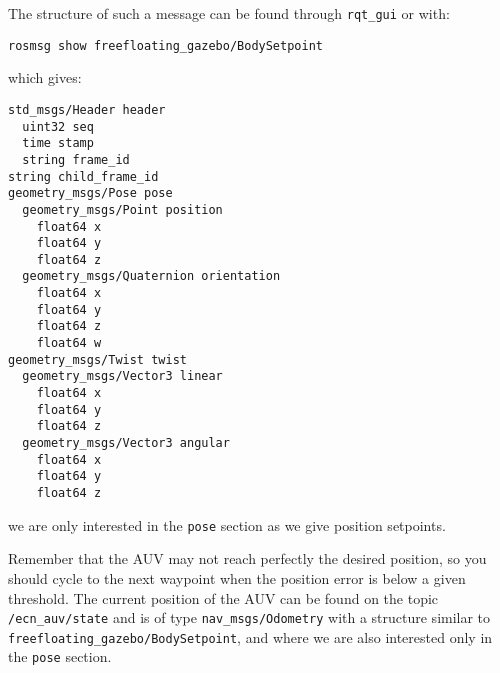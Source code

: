 \documentclass{ecnreport}
\begin{document}
The structure of such a message can be found through \texttt{rqt\_gui} or with:
\begin{center}
\begin{lstlisting}
rosmsg show freefloating_gazebo/BodySetpoint
\end{lstlisting}
\end{center}
which gives:
\begin{center}
\begin{lstlisting}
std_msgs/Header header
  uint32 seq
  time stamp
  string frame_id
string child_frame_id
geometry_msgs/Pose pose
  geometry_msgs/Point position
    float64 x
    float64 y
    float64 z
  geometry_msgs/Quaternion orientation
    float64 x
    float64 y
    float64 z
    float64 w
geometry_msgs/Twist twist
  geometry_msgs/Vector3 linear
    float64 x
    float64 y
    float64 z
  geometry_msgs/Vector3 angular
    float64 x
    float64 y
    float64 z
\end{lstlisting}
\end{center}we are only interested in the \texttt{pose} section as we give position setpoints.

Remember that the AUV may not reach perfectly the desired position, so you should cycle to the next waypoint when the position error is below a given threshold.
The current position of the AUV can be found on the topic \texttt{/ecn\_auv/state} and is of type \texttt{nav\_msgs/Odometry} with a structure similar to \texttt{freefloating\_gazebo/BodySetpoint}, and where we are also interested only
in the \texttt{pose} section.
\end{document}
